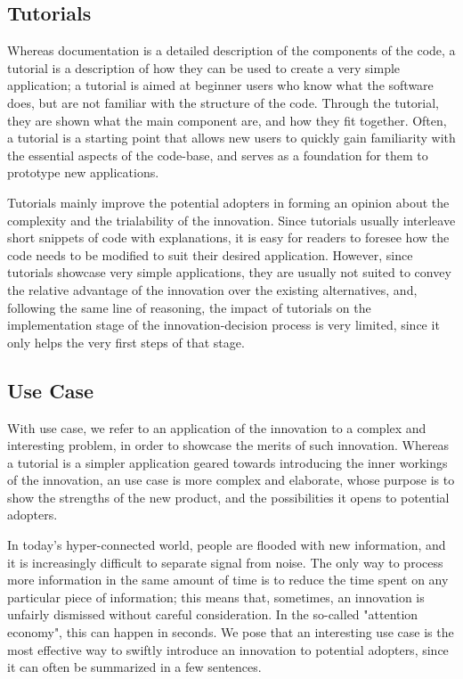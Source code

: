 \documentclass[12pt]{article}
\begin{document}
\subsection{Tutorials}
\label{sec:org504f9d6}
Whereas documentation is a detailed description of the components of the code, a tutorial is a description of how they can be used to create a very simple application; a tutorial is aimed at beginner users who know what the software does, but are not familiar with the structure of the code. Through the tutorial, they are shown what the main component are, and how they fit together. Often, a tutorial is a starting point that allows new users to quickly gain familiarity with the essential aspects of the code-base, and serves as a foundation for them to prototype new applications.

Tutorials mainly improve the potential adopters in forming an opinion about the complexity and the trialability of the innovation. Since tutorials usually interleave short snippets of code with explanations, it is easy for readers to foresee how the code needs to be modified to suit their desired application. However, since tutorials showcase very simple applications, they are usually not suited to convey the relative advantage of the innovation over the existing alternatives, and, following the same line of reasoning, the impact of tutorials on the implementation stage of the innovation-decision process is very limited, since it only helps the very first steps of that stage.

\subsection{Use Case}
\label{sec:orgbff496e}
With use case, we refer to an application of the innovation to a complex and interesting problem, in order to showcase the merits of such innovation. Whereas a tutorial is a simpler application geared towards introducing the  inner workings of the innovation, an use case is more complex and elaborate, whose purpose is to show the strengths of the new product, and the possibilities it opens to potential adopters.

In today's hyper-connected world, people are flooded with new information, and it is increasingly difficult to separate signal from noise. The only way to process more information in the same amount of time is to reduce the time spent on any particular piece of information; this means that, sometimes, an innovation is unfairly dismissed without careful consideration. In the so-called "attention economy", this can happen in seconds. We pose that an interesting use case is the most effective way to swiftly introduce an innovation to potential adopters, since it can often be summarized in a few sentences.
\end{document}
